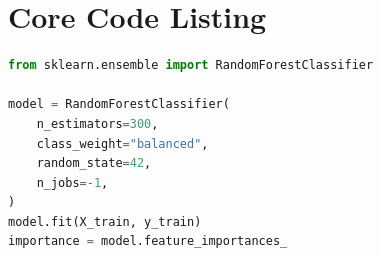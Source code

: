 \chapter{Core Code Listing}
\begin{lstlisting}[language=Python, caption={Random Forest model configuration used in the thesis.}]
from sklearn.ensemble import RandomForestClassifier

model = RandomForestClassifier(
    n_estimators=300,
    class_weight="balanced",
    random_state=42,
    n_jobs=-1,
)
model.fit(X_train, y_train)
importance = model.feature_importances_
\end{lstlisting}
